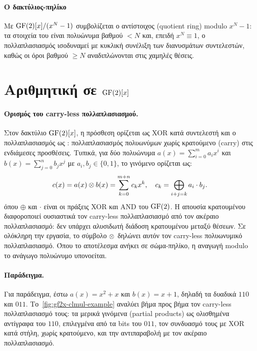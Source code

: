 \paragraph{Ο δακτύλιος-πηλίκο}
Με $\mathrm{GF}(2)[x]/(x^{N}-1)$ συμβολίζεται ο αντίστοιχος  (quotient ring) modulo $x^N-1$: τα στοιχεία του είναι πολυώνυμα βαθμού $<N$ και, επειδή $x^N \equiv 1$, ο πολλαπλασιασμός ισοδυναμεί με κυκλική συνέλιξη των διανυσμάτων συντελεστών, καθώς οι όροι βαθμού $\geq N$ αναδιπλώνονται στις χαμηλές θέσεις.

\section{Αριθμητική σε \texorpdfstring{$\mathrm{GF}(2)[x]$}{GF(2)[x]}}
\label{sec:gf2x-arithmetic}

\paragraph{Ορισμός του carry-less πολλαπλασιασμού.}
Στον δακτύλιο $\mathrm{GF}(2)[x]$, η πρόσθεση ορίζεται ως
XOR κατά συντελεστή και ο πολλαπλασιασμός ως :
πολλαπλασιασμός πολυωνύμων χωρίς κρατούμενο (carry) στις ενδιάμεσες προσθέσεις.
Τυπικά, για δύο πολυώνυμα $a(x) = \sum_{i=0}^{m} a_i x^i$ και
$b(x) = \sum_{j=0}^{n} b_j x^j$ με $a_i, b_j \in \{0, 1\}$, το γινόμενο
ορίζεται ως:
\begin{equation}
  c(x) = a(x) \otimes b(x) = \sum_{k=0}^{m+n} c_k x^k, \quad
  c_k = \bigoplus_{i+j=k} a_i \cdot b_j.
  \label{eq:gf2x-product}
\end{equation}
όπου $\oplus$ και $\cdot$ είναι οι πράξεις XOR και AND του $\mathrm{GF}(2)$.
Η απουσία κρατουμένου διαφοροποιεί ουσιαστικά τον carry-less πολλαπλασιασμό
από τον ακέραιο πολλαπλασιασμό: δεν υπάρχει αλυσιδωτή διάδοση κρατουμένου μεταξύ θέσεων. Σε ολόκληρη την εργασία, το σύμβολο $\otimes$ δηλώνει αυτόν τον carry-less πολυωνυμικό πολλαπλασιασμό. Όπου το αποτέλεσμα ανήκει σε σώμα-πηλίκο, η αναγωγή modulo το ανάγωγο πολυώνυμο υπονοείται.

\paragraph{Παράδειγμα.}
Για παράδειγμα, έστω $a(x) = x^2 + x$ και $b(x) = x + 1$, δηλαδή τα δυαδικά $110$ και $011$. Το~\cref{fig:gf2x-clmul-example} αναλύει βήμα προς βήμα τον carry-less πολλαπλασιασμό τους: τα μερικά γινόμενα (partial products) ως ολισθημένα αντίγραφα του $110$, επιλεγμένα από τα bits του $011$, τον συνδυασμό τους με XOR κατά στήλη, χωρίς κρατούμενο, και την αντιπαραβολή με τον ακέραιο πολλαπλασιασμό.


